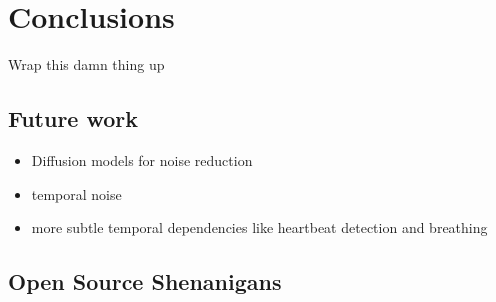 \chapter{Conclusions}
\label{ch:conclusions}

Wrap this damn thing up

\section{Future work}

\begin{itemize}
    \item Diffusion models for noise reduction
    \item temporal noise
    \item more subtle temporal dependencies like heartbeat detection and breathing
\end{itemize}

\section{Open Source Shenanigans}
